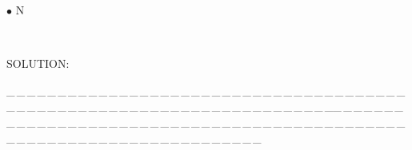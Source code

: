 \documentclass[a4paper, 11pt, UTF8]{article}
\begin{document}
\begin{large}
{\small $\bullet$}
{\timesbf\Large N} {\timessl\Large 
}\par\quad\,
{\timessl\Large
}\par
{\timesbf S\footnotesize{OLUTION:}}\par\quad

\par
{\tiny \_\,\_\,\_\,\_\,\_\,\_\,\_\,\_\,\_\,\_\,\_\,\_\,\_\,\_\,\_\,\_\,\_\,\_\,\_\,\_\,\_\,\_\,\_\,\_\,\_\,\_\,\_\,\_\,\_\,\_\,\_\,\_\,\_\,\_\,\_\,\_\,\_\,\_\,\_\,\_\,\_\,\_\,\_\,\_\,\_\,\_\,\_\,\_\,\_\,\_\,\_\,\_\,\_\,\_\,\_\,\_\,\_\,\_\,\_\,\_\,\_\,\_\,\_\,\_\,\_\,\_\,\_\,\_\,\_\,\_\,\_\_\,\_\,\_\,\_\,\_\,\_\,\_\,\_\,\_\,\_\,\_\,\_\,\_\,\_\,\_\,\_\,\_\,\_\,\_\,\_\,\_\,\_\,\_\,\_\,\_\,\_\,\_\,\_\,\_\,\_\,\_\,\_\,\_\,\_\,\_\,\_\,\_\,\_\,\_\,\_\,\_\,\_\,\_\,\_\,\_\,\_\,\_\,\_\,\_\,\_\,\_\,\_\,\_\,\_\,\_\,\_\,\_\,\_\,\_\,\_\,\_\,\_\,\_\,\_\,\_\,\_\,\_\,\_\,\_\,\_\,\_}\par

\par{\tiny\,\par}

\end{large}
\end{document}
